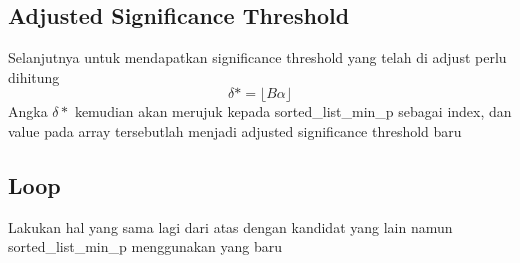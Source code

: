 \documentclass[a4paper,twoside]{article}
\begin{document}
\subsection{Adjusted Significance Threshold}
Selanjutnya untuk mendapatkan significance threshold yang telah di adjust perlu dihitung
\[ \delta* = \lfloor B\alpha \rfloor\]
Angka $\delta*$ kemudian akan merujuk kepada sorted\_list\_min\_p sebagai index, dan value pada array tersebutlah menjadi adjusted significance threshold baru

\subsection{Loop}
Lakukan hal yang sama lagi dari atas dengan kandidat yang lain namun sorted\_list\_min\_p menggunakan yang baru
\end{document}

